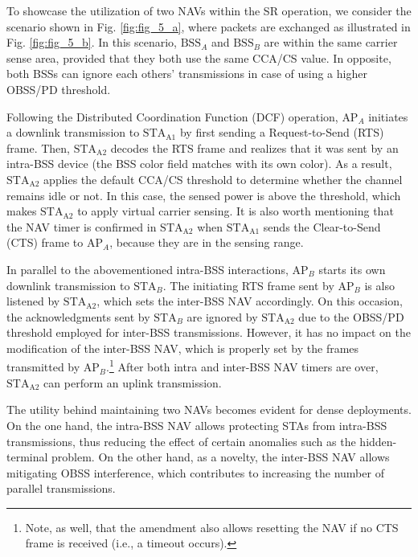 \documentclass{ieeeaccess}
\begin{document}
To showcase the utilization of two NAVs within the SR operation, we consider the scenario shown in Fig. \ref{fig:fig_5_a}, where packets are exchanged as illustrated in Fig. \ref{fig:fig_5_b}. In this scenario, $\text{BSS}_A$ and $\text{BSS}_B$ are within the same carrier sense area, provided that they both use the same CCA/CS value. In opposite, both BSSs can ignore each others' transmissions in case of using a higher OBSS/PD threshold.

Following the Distributed Coordination Function (DCF) operation, $\text{AP}_A$ initiates a downlink transmission to $\text{STA}_\text{A1}$ by first sending a Request-to-Send (RTS) frame. Then, $\text{STA}_\text{A2}$ decodes the RTS frame and realizes that it was sent by an intra-BSS device (the BSS color field matches with its own color). As a result, $\text{STA}_\text{A2}$ applies the default CCA/CS threshold to determine whether the channel remains idle or not. In this case, the sensed power is above the threshold, which makes $\text{STA}_\text{A2}$ to apply virtual carrier sensing. It is also worth mentioning that the NAV timer is confirmed in $\text{STA}_\text{A2}$ when $\text{STA}_\text{A1}$ sends the Clear-to-Send (CTS) frame to $\text{AP}_A$, because they are in the sensing range. 

In parallel to the abovementioned intra-BSS interactions, $\text{AP}_B$ starts its own downlink transmission to $\text{STA}_B$. The initiating RTS frame sent by $\text{AP}_B$ is also listened by $\text{STA}_\text{A2}$, which sets the inter-BSS NAV accordingly. On this occasion, the acknowledgments sent by $\text{STA}_B$ are ignored by $\text{STA}_\text{A2}$ due to the OBSS/PD threshold employed for inter-BSS transmissions. However, it has no impact on the modification of the inter-BSS NAV, which is properly set by the frames transmitted by $\text{AP}_B$.\footnote{Note, as well, that the amendment also allows resetting the NAV if no CTS frame is received (i.e., a timeout occurs).} After both intra and inter-BSS NAV timers are over, $\text{STA}_\text{A2}$ can perform an uplink transmission.

The utility behind maintaining two NAVs becomes evident for dense deployments. On the one hand, the intra-BSS NAV allows protecting STAs from intra-BSS transmissions, thus reducing the effect of certain anomalies such as the hidden-terminal problem. On the other hand, as a novelty, the inter-BSS NAV allows mitigating OBSS interference, which contributes to increasing the number of parallel transmissions. 
\end{document}

